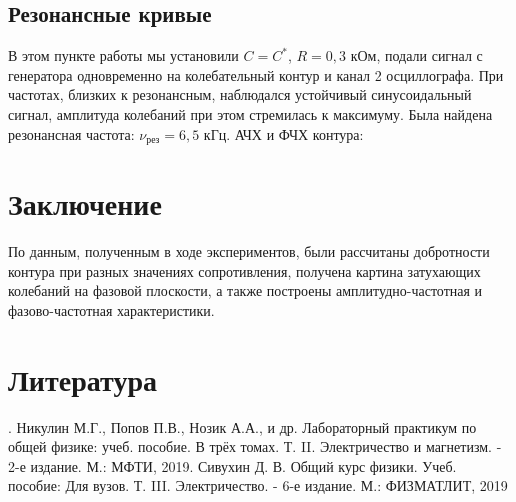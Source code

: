 \subsection*{Резонансные кривые}
В этом пункте работы мы установили $C = C^*$, $R = 0,3$ кОм, подали сигнал с генератора одновременно на колебательный контур и канал 2 осциллографа. При частотах, близких к резонансным, наблюдался устойчивый синусоидальный сигнал, амплитуда колебаний при этом стремилась к максимуму. Была найдена резонансная частота: $\nu_{\text{рез}} = 6,5$ кГц.
\n\n
АЧХ и ФЧХ контура:
\begin{figure}[H]
\centering
{}
\qquad
{}
\end{figure}
\section*{Заключение}
По данным, полученным в ходе экспериментов, были рассчитаны добротности контура при разных значениях сопротивления, получена картина затухающих колебаний на фазовой плоскости, а также построены амплитудно-частотная и фазово-частотная характеристики.

\section*{Литература}
. Никулин М.Г., Попов П.В., Нозик А.А., и др. Лабораторный практикум по общей физике: учеб. пособие. В трёх томах. Т. II. Электричество и магнетизм. - 2-е издание. М.: МФТИ, 2019. Сивухин Д. В. Общий курс физики. Учеб. пособие: Для вузов. Т. III. Электричество. - 6-е издание. М.: ФИЗМАТЛИТ, 2019
